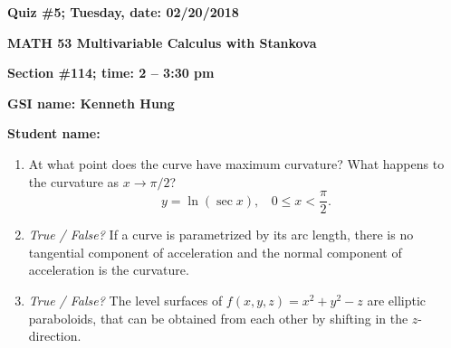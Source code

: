 \documentclass{article}
\begin{document}
{\bf Quiz \#5; Tuesday, date: 02/20/2018}

{\bf MATH 53 Multivariable Calculus with Stankova}

{\bf Section \#114; time: 2 -- 3:30 pm}

{\bf GSI name: Kenneth Hung}

{\bf Student name:}

\vspace*{0.25in}

\begin{enumerate}
\item At what point does the curve have maximum curvature? What happens to the curvature as $x \to \pi / 2$?
\[
y = \ln (\sec x), ~~~~ 0 \le x < \frac{\pi}{2}.
\]

\item {\em True / False?} If a curve is parametrized by its arc length, there is no tangential component of acceleration and the normal component of acceleration is the curvature.

\item {\em True / False?} The level surfaces of $f(x, y, z) = x^2 + y^2 - z$ are elliptic paraboloids, that can be obtained from each other by shifting in the $z$-direction.
\end{enumerate}
\end{document}
